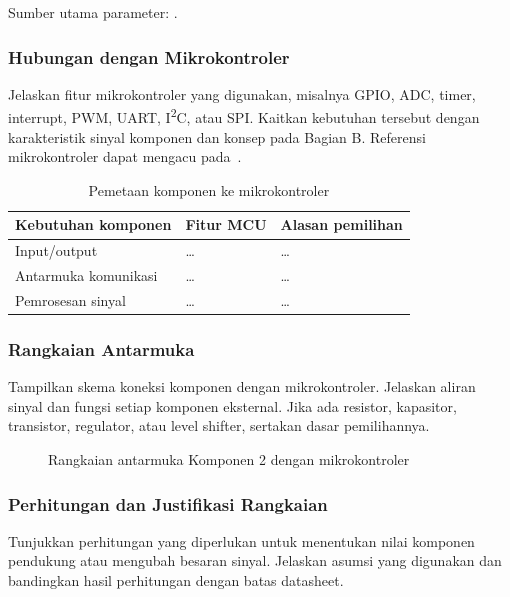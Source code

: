 Sumber utama parameter: \cite{datasheet}.

\subsubsection{Hubungan dengan Mikrokontroler}
Jelaskan fitur mikrokontroler yang digunakan, misalnya GPIO, ADC, timer,
interrupt, PWM, UART, I\textsuperscript{2}C, atau SPI. Kaitkan kebutuhan
tersebut dengan karakteristik sinyal komponen dan konsep pada Bagian B.
Referensi mikrokontroler dapat mengacu pada~\cite{mcu}.

\begin{table}[H]
\centering
\caption{Pemetaan komponen ke mikrokontroler}
\begin{tabularx}{\textwidth}{@{}lXX@{}}
\toprule
Kebutuhan komponen & Fitur MCU & Alasan pemilihan \\
\midrule
Input/output & \dots & \dots \\
Antarmuka komunikasi & \dots & \dots \\
Pemrosesan sinyal & \dots & \dots \\
\bottomrule
\end{tabularx}
\end{table}

\subsubsection{Rangkaian Antarmuka}
Tampilkan skema koneksi komponen dengan mikrokontroler. Jelaskan aliran
sinyal dan fungsi setiap komponen eksternal. Jika ada resistor, kapasitor,
transistor, regulator, atau level shifter, sertakan dasar pemilihannya.

\begin{figure}[H]
\centering
\caption{Rangkaian antarmuka Komponen 2 dengan mikrokontroler}
\label{fig:rangkaian-komponen-02}
\end{figure}

\subsubsection{Perhitungan dan Justifikasi Rangkaian}
Tunjukkan perhitungan yang diperlukan untuk menentukan nilai komponen
pendukung atau mengubah besaran sinyal. Jelaskan asumsi yang digunakan dan
bandingkan hasil perhitungan dengan batas datasheet.

